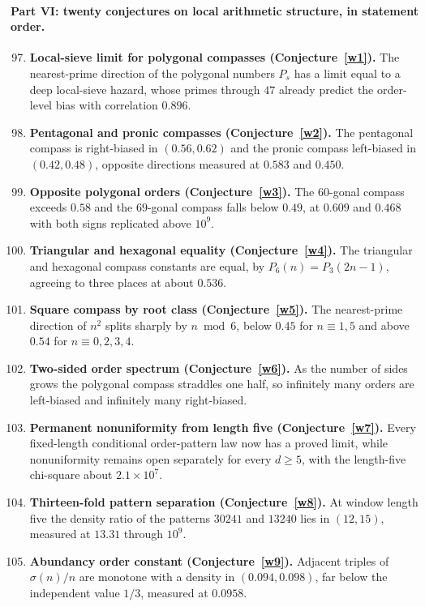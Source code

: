 \documentclass[11pt]{article}
\theoremstyle{definition}
\begin{document}
\paragraph{Part VI: twenty conjectures on local arithmetic structure, in statement order.}
\begin{enumerate}\setcounter{enumi}{96}
\item \textbf{Local-sieve limit for polygonal compasses (Conjecture~\ref{w1}).}  The nearest-prime direction of the polygonal numbers $P_s$ has a limit equal to a deep local-sieve hazard, whose primes through $47$ already predict the order-level bias with correlation $0.896$.
\item \textbf{Pentagonal and pronic compasses (Conjecture~\ref{w2}).}  The pentagonal compass is right-biased in $(0.56,0.62)$ and the pronic compass left-biased in $(0.42,0.48)$, opposite directions measured at $0.583$ and $0.450$.
\item \textbf{Opposite polygonal orders (Conjecture~\ref{w3}).}  The $60$-gonal compass exceeds $0.58$ and the $69$-gonal compass falls below $0.49$, at $0.609$ and $0.468$ with both signs replicated above $10^9$.
\item \textbf{Triangular and hexagonal equality (Conjecture~\ref{w4}).}  The triangular and hexagonal compass constants are equal, by $P_6(n)=P_3(2n-1)$, agreeing to three places at about $0.536$.
\item \textbf{Square compass by root class (Conjecture~\ref{w5}).}  The nearest-prime direction of $n^2$ splits sharply by $n\bmod6$, below $0.45$ for $n\equiv1,5$ and above $0.54$ for $n\equiv0,2,3,4$.
\item \textbf{Two-sided order spectrum (Conjecture~\ref{w6}).}  As the number of sides grows the polygonal compass straddles one half, so infinitely many orders are left-biased and infinitely many right-biased.
\item \textbf{Permanent nonuniformity from length five (Conjecture~\ref{w7}).}  Every fixed-length conditional order-pattern law now has a proved limit, while nonuniformity remains open separately for every $d\ge5$, with the length-five chi-square about $2.1\times10^7$.
\item \textbf{Thirteen-fold pattern separation (Conjecture~\ref{w8}).}  At window length five the density ratio of the patterns $30241$ and $13240$ lies in $(12,15)$, measured at $13.31$ through $10^9$.
\item \textbf{Abundancy order constant (Conjecture~\ref{w9}).}  Adjacent triples of $\sigma(n)/n$ are monotone with a density in $(0.094,0.098)$, far below the independent value $1/3$, measured at $0.0958$.

\end{enumerate}
\end{document}
